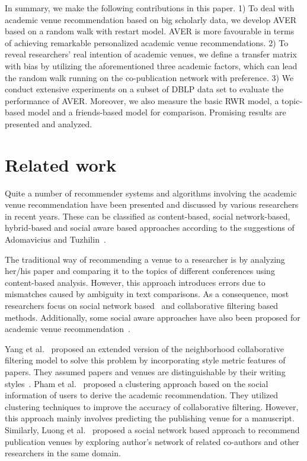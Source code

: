 \documentclass{sig-alternate-2013}
\begin{document}
In summary, we make the following contributions in this paper. 1) To deal with academic venue recommendation based on big scholarly data, we develop AVER based on a random walk with restart model. AVER is more favourable in terms of achieving remarkable personalized academic venue recommendations. 2) To reveal researchers' real intention of academic venues, we define a transfer matrix with bias by utilizing the aforementioned three academic factors, which can lead the random walk running on the co-publication network with preference. 3) We conduct extensive experiments on a subset of DBLP data set to evaluate the performance of AVER. Moreover, we also measure the basic RWR model, a topic-based model and a friends-based model for comparison. Promising results are presented and analyzed.

\section{Related work}
Quite a number of recommender systems and algorithms involving the academic venue recommendation have been presented and discussed by various researchers in recent years. These can be classified as content-based, social network-based, hybrid-based and social aware based approaches according to the suggestions of Adomavicius and Tuzhilin~\cite{adomavicius2005toward}.

The traditional way of recommending a venue to a researcher is by analyzing her/his paper and comparing it to the topics of different conferences using content-based analysis. However, this approach introduces errors due to mismatches caused by ambiguity in text comparisons. As a consequence, most researchers focus on social network based~\cite{luong2012publication,chen2012social} and collaborative filtering based~\cite{pham2011clustering,yang2012venue} methods. Additionally, some social aware approaches have also been proposed for academic venue recommendation~\cite{asabere2014improving,xia2013socially,hornick2012extending}.

Yang et al.~\cite{yang2012venue} proposed an extended version of the neighborhood collaborative filtering model to solve this problem by incorporating style metric features of papers. They assumed papers and venues are distinguishable by their writing styles~\cite{yang2012distinguishing}. Pham et al.~\cite{pham2011clustering} proposed a clustering approach based on the social information of users to derive the academic recommendation. They utilized clustering techniques to improve the accuracy of collaborative filtering. However, this approach mainly involves predicting the publishing venue for a manuscript. Similarly, Luong et al.~\cite{luong2012publication} proposed a social network based approach to recommend publication venues by exploring author's network of related co-authors and other researchers in the same domain.
\end{document}
